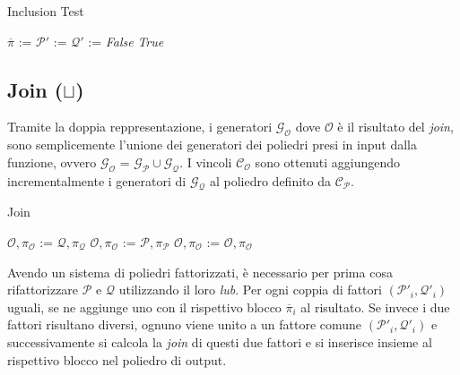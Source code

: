 \documentclass{mimosis}
\theoremstyle{definition}
\begin{document}
\begin{algorithm}[H]
\caption{Inclusion Test}\label{inclusion test}
\begin{algorithmic}[1]
\State$\overline{\pi}$ := 
\State$\mathcal{P}'$ := 
\State$\mathcal{Q}'$ := 
 
\State\Return\textit{False}
\EndIf
\EndFor
\State\Return\textit{True}
\EndFunction
\end{algorithmic}
\end{algorithm}

\subsection{Join (\(\sqcup\))}
\label{sec:orgf7433f1}
Tramite la doppia reppresentazione, i generatori \(\mathcal{G}_{\mathcal{O}}\)
dove \(\mathcal{O}\) è il risultato del \emph{join}, sono semplicemente l'unione dei
generatori dei poliedri presi in input dalla funzione, ovvero
\(\mathcal{G}_{\mathcal{O}}\) = \(\mathcal{G}_{\mathcal{P}} \cup
\mathcal{G}_{\mathcal{Q}}\). I vincoli \(\mathcal{C}_{\mathcal{O}}\) sono ottenuti
aggiungendo incrementalmente i generatori di \(\mathcal{G}_{\mathcal{Q}}\) al
poliedro definito da \(\mathcal{C}_{\mathcal{P}}\).

\begin{algorithm}[H]
\caption{Join}\label{join}
\begin{algorithmic}[1]
\State$\mathcal{O}, \pi_{\mathcal{O}}$ := $\mathcal{Q}, \pi_{\mathcal{Q}}$
\State$\mathcal{O}, \pi_{\mathcal{O}}$ := $\mathcal{P}, \pi_{\mathcal{P}}$
\Else
\State$\mathcal{O}, \pi_{\mathcal{O}}$ := 
\EndIf
\State\Return$\mathcal{O}, \pi_{\mathcal{O}}$
\EndFunction
\end{algorithmic}
\end{algorithm}

Avendo un sistema di poliedri fattorizzati, è necessario per prima cosa
rifattorizzare \(\mathcal{P}\) e \(\mathcal{Q}\) utilizzando il loro \emph{lub}. Per ogni
coppia di fattori \((\mathcal{P}'_{i}, \mathcal{Q}'_{i})\) uguali, se ne aggiunge
uno con il rispettivo blocco \(\overline{\pi}_i\) al risultato. Se invece i due
fattori risultano diversi, ognuno viene unito a un fattore comune
\((\mathcal{P}'_{i}, \mathcal{Q}'_{i})\) e successivamente si calcola la \emph{join} di
questi due fattori e si inserisce insieme al rispettivo blocco nel poliedro di
output.
\end{document}
